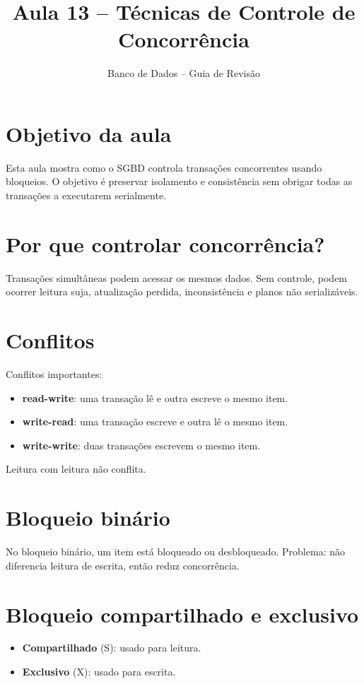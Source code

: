 \documentclass[12pt,a4paper]{article}
\title{Aula 13 -- Técnicas de Controle de Concorrência}
\author{Banco de Dados -- Guia de Revisão}
\date{}
\begin{document}
\maketitle
\tableofcontents
\newpage

\section{Objetivo da aula}
Esta aula mostra como o SGBD controla transações concorrentes usando bloqueios. O objetivo é preservar isolamento e consistência sem obrigar todas as transações a executarem serialmente.

\section{Por que controlar concorrência?}
Transações simultâneas podem acessar os mesmos dados. Sem controle, podem ocorrer leitura suja, atualização perdida, inconsistência e planos não serializáveis.

\section{Conflitos}
Conflitos importantes:
\begin{itemize}
    \item \textbf{read-write}: uma transação lê e outra escreve o mesmo item.
    \item \textbf{write-read}: uma transação escreve e outra lê o mesmo item.
    \item \textbf{write-write}: duas transações escrevem o mesmo item.
\end{itemize}
Leitura com leitura não conflita.

\section{Bloqueio binário}
No bloqueio binário, um item está bloqueado ou desbloqueado. Problema: não diferencia leitura de escrita, então reduz concorrência.

\section{Bloqueio compartilhado e exclusivo}
\begin{itemize}
    \item \textbf{Compartilhado} (S): usado para leitura.
    \item \textbf{Exclusivo} (X): usado para escrita.
\end{itemize}
\end{document}
